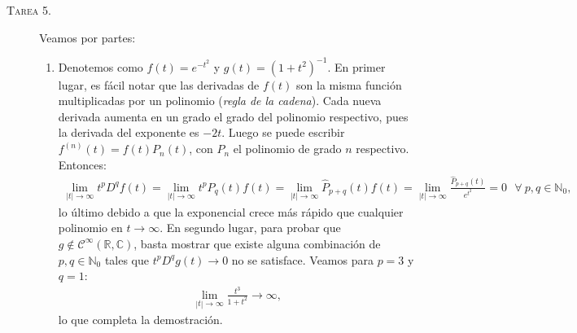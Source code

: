 \documentclass[spanish, fleqn]{article}
\begin{document}
\begin{description}
	\item[\textsc{Tarea 5.}] Veamos por partes:
	\begin{enumerate}
		\item Denotemos como $\displaystyle f(t)=e^{-t^2}$ y $\displaystyle g(t)=(1+t^2)^{-1}$. En primer lugar, es fácil notar que las derivadas de $f(t)$ son la misma función multiplicadas por un polinomio (\textit{regla de la cadena}). Cada nueva derivada aumenta en un grado el grado del polinomio respectivo, pues la derivada del exponente es $-2t$.
		Luego se puede escribir $f^{(n)}(t)=f(t)P_n(t)$, con $P_n$ el polinomio de grado $n$ respectivo. Entonces:
		\begin{align*}
			\lim_{|t|\rightarrow \infty} t^p D^q f(t) = \lim_{|t|\rightarrow \infty} t^p P_q(t) f(t) = \lim_{|t|\rightarrow \infty} \widehat{P}_{p+q}(t) f(t) = \lim_{|t|\rightarrow \infty} \frac{\widehat{P}_{p+q}(t)}{e^{t^2}} = 0 \ \ \ \forall \ p,q \in \mathbb{N}_0,
		\end{align*}
		lo último debido a que la exponencial crece más rápido que cualquier polinomio en $t \rightarrow \infty$. En segundo lugar, para probar que $g \notin \mathcal{C}^{\infty}(\mathbb{R},\mathbb{C})$, basta mostrar que existe alguna combinación de $p,q \in \mathbb{N}_0$ tales que $t^p D^q g(t) \rightarrow 0$ no se satisface. Veamos para $p=3$ y $q=1$:
		\begin{align*}
			\lim_{|t|\rightarrow \infty} \frac{t^3}{1+t^2} \rightarrow \infty,
		\end{align*}
		lo que completa la demostración.


\end{enumerate}
\end{description}
\end{document}
